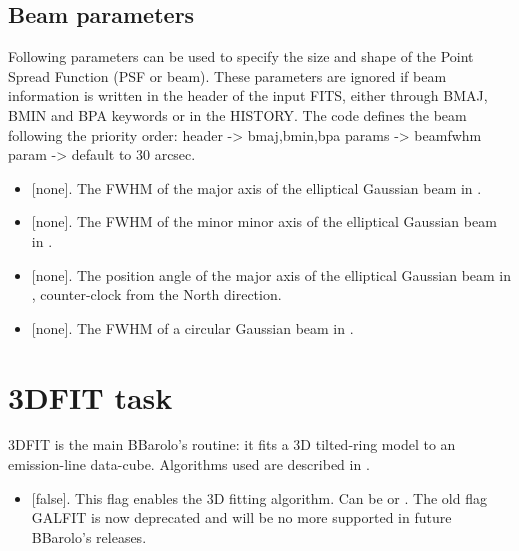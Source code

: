 \documentclass[letterpaper,10pt,english]{sphinxmanual}
\begin{document}
\subsection{Beam parameters}
\label{\detokenize{tasks:beam-parameters}}
Following parameters can be used to specify the size and shape of the Point Spread Function (PSF or beam). These parameters are ignored if beam information is written in the header of the input FITS, either through BMAJ, BMIN and BPA keywords or in the HISTORY. The code defines the beam following the priority order: header -\textgreater{} bmaj,bmin,bpa params -\textgreater{} beamfwhm param -\textgreater{} default to 30 arcsec.
\begin{itemize}
\item {} 
 {[}none{]}. The FWHM of the major axis of the elliptical Gaussian beam in .

\item {} 
 {[}none{]}. The FWHM of the minor minor axis of the elliptical Gaussian beam in .

\item {} 
 {[}none{]}. The position angle of the major axis of the elliptical Gaussian beam in , counter-clock from the North direction.

\item {} 
 {[}none{]}. The FWHM of a circular Gaussian beam in  .

\end{itemize}


\section{3DFIT task}
\label{\detokenize{tasks:dfit-task}}\label{\detokenize{tasks:dfit}}
3DFIT is the main BBarolo’s routine: it fits a 3D tilted-ring model to an emission-line data-cube. Algorithms used are described in .
\begin{itemize}
\item {} 
 {[}false{]}. This flag enables the 3D fitting algorithm. Can be  or . The old flag GALFIT is now deprecated and will be no more supported in future BBarolo’s releases.

\end{itemize}
\end{document}

